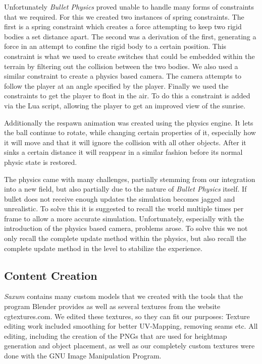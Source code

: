 \documentclass[sponsored]{acmsiggraph}
\begin{document}
Unfortunately \textit{Bullet Physics} proved unable to handle many forms of constraints that we required. For this we created two instances of spring constraints. The first is a spring constraint which creates a force attempting to keep two rigid bodies a set distance apart. The second was a derivation of the first, generating a force in an attempt to confine the rigid body to a certain position. This constraint is what we used to create switches that could be embedded within the terrain by filtering out the collision between the two bodies.
We also used a similar constraint to create a physics based camera. The camera attempts to follow the player at an angle specified by the player. Finally we used the constraints to get the player to float in the air. To do this a constraint is added via the Lua script, allowing the player to get an improved view of the sunrise.

Additionally the respawn animation was created using the physics engine. It lets the ball continue to rotate, while changing certain properties of it, especially how it will move and that it will ignore the collision with all other objects. After it sinks a certain distance it will reappear in a similar fashion before its normal physic state is restored.

The physics came with many challenges, partially stemming from our integration into a new field, but also partially due to the nature of \textit{Bullet Physics} itself. If bullet does not receive enough updates the simulation becomes jagged and unrealistic. To solve this it is suggested to recall the world multiple times per frame to allow a more accurate simulation. Unfortunately, especially with the introduction of the physics based camera, problems arose. To solve this we not only recall the complete update method within the physics, but also recall the complete update method in the level to stabilize the experience.

\subsection{Content Creation}
\textit{Saxum} contains many custom models that we created with the tools that the program Blender provides as well as several textures from the website cgtextures.com. We edited these textures, so they can fit our purposes: Texture editing work included smoothing for better UV-Mapping, removing seams etc. All editing, including the creation of the PNGs that are used for heightmap generation and object placement, as well as our completely custom textures were done with the GNU Image Manipulation Program.
\end{document}
